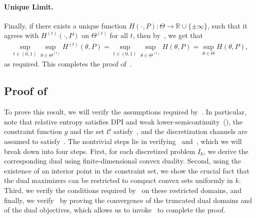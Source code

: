 \documentclass{article}
\theoremstyle{plain}
\theoremstyle{definition}
\newcommand{\R}{\mathbb{R}}
\newcommand{\calC}{\mathcal C}
\begin{document}
\paragraph{Unique Limit.} Finally, if there exists a unique function $H(\cdot, P): \Theta \to \R \cup \{\pm \infty\}$, such that it agrees with $H^{(t)}(\cdot, P)$ on $\Theta^{(t)}$ for all $t$, then by~, we get that 
\begin{align}
    \sup_{t \in (0,1)} \sup_{\theta \in \Theta^{(t)}} H^{(t)}(\theta, P) =  \sup_{t \in (0,1)} \sup_{\theta \in \Theta^{(t)}} H(\theta, P) = \sup_{\theta \in \Theta} H(\theta, P), 
\end{align}
as required. This completes the proof of~. 







\subsection{Proof of~}
\label{proof:general-constraint-KL}
To prove this result, we will verify the assumptions required by~. In particular, note that relative entropy satisfies DPI and weak lower-semicontinuity~(), the constraint function $g$ and the set $\calC$ satisfy~,  and the discretization channels are assumed to satisfy~. The nontrivial steps lie in verifying~ and~, which we will break down into four steps. First, for each discretized problem $I_k$, we derive the corresponding dual using finite-dimensional  convex duality. Second, using the existence of an interior point in the constraint set, we show the crucial fact that the dual maximizers can be restricted to compact convex sets uniformly in $k$. Third, we verify the conditions required by~ on these restricted domains, and finally, we verify~ by proving the convergence of the truncated dual domains and of the dual objectives, which allows us to invoke~ to complete the proof. 
\end{document}
